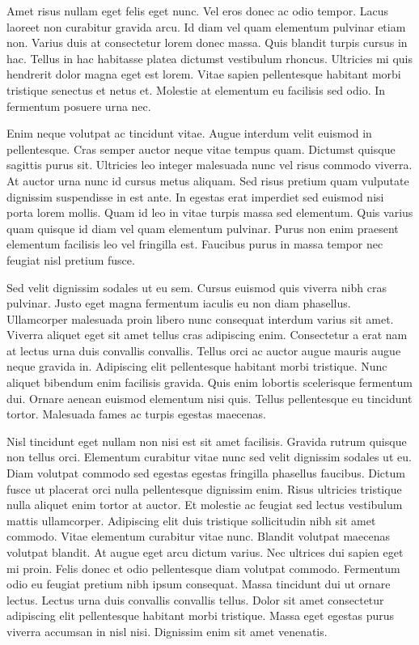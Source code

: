 \documentclass[11pt,a4paper]{article}
\begin{document}
Amet risus nullam eget felis eget nunc. Vel eros donec ac odio tempor. Lacus laoreet non curabitur gravida arcu. Id diam vel quam elementum pulvinar etiam non. Varius duis at consectetur lorem donec massa. Quis blandit turpis cursus in hac. Tellus in hac habitasse platea dictumst vestibulum rhoncus. Ultricies mi quis hendrerit dolor magna eget est lorem. Vitae sapien pellentesque habitant morbi tristique senectus et netus et. Molestie at elementum eu facilisis sed odio. In fermentum posuere urna nec.

Enim neque volutpat ac tincidunt vitae. Augue interdum velit euismod in pellentesque. Cras semper auctor neque vitae tempus quam. Dictumst quisque sagittis purus sit. Ultricies leo integer malesuada nunc vel risus commodo viverra. At auctor urna nunc id cursus metus aliquam. Sed risus pretium quam vulputate dignissim suspendisse in est ante. In egestas erat imperdiet sed euismod nisi porta lorem mollis. Quam id leo in vitae turpis massa sed elementum. Quis varius quam quisque id diam vel quam elementum pulvinar. Purus non enim praesent elementum facilisis leo vel fringilla est. Faucibus purus in massa tempor nec feugiat nisl pretium fusce.

Sed velit dignissim sodales ut eu sem. Cursus euismod quis viverra nibh cras pulvinar. Justo eget magna fermentum iaculis eu non diam phasellus. Ullamcorper malesuada proin libero nunc consequat interdum varius sit amet. Viverra aliquet eget sit amet tellus cras adipiscing enim. Consectetur a erat nam at lectus urna duis convallis convallis. Tellus orci ac auctor augue mauris augue neque gravida in. Adipiscing elit pellentesque habitant morbi tristique. Nunc aliquet bibendum enim facilisis gravida. Quis enim lobortis scelerisque fermentum dui. Ornare aenean euismod elementum nisi quis. Tellus pellentesque eu tincidunt tortor. Malesuada fames ac turpis egestas maecenas.

Nisl tincidunt eget nullam non nisi est sit amet facilisis. Gravida rutrum quisque non tellus orci. Elementum curabitur vitae nunc sed velit dignissim sodales ut eu. Diam volutpat commodo sed egestas egestas fringilla phasellus faucibus. Dictum fusce ut placerat orci nulla pellentesque dignissim enim. Risus ultricies tristique nulla aliquet enim tortor at auctor. Et molestie ac feugiat sed lectus vestibulum mattis ullamcorper. Adipiscing elit duis tristique sollicitudin nibh sit amet commodo. Vitae elementum curabitur vitae nunc. Blandit volutpat maecenas volutpat blandit. At augue eget arcu dictum varius. Nec ultrices dui sapien eget mi proin. Felis donec et odio pellentesque diam volutpat commodo. Fermentum odio eu feugiat pretium nibh ipsum consequat. Massa tincidunt dui ut ornare lectus. Lectus urna duis convallis convallis tellus. Dolor sit amet consectetur adipiscing elit pellentesque habitant morbi tristique. Massa eget egestas purus viverra accumsan in nisl nisi. Dignissim enim sit amet venenatis.
\end{document}
